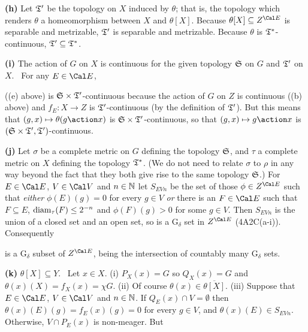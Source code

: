 {\medskip

{\bf (h)} Let $\frak T'$ be the topology on $X$ induced by $\theta$;
that is, the topology which renders $\theta$ a homeomorphism between $X$
and $\theta[X]$.   Because $\theta[X]\subseteq Z^{\Cal E}$ is separable
and metrizable, $\frak T'$ is separable and metrizable.   Because
$\theta$ is
$\frak T^*$-continuous, $\frak T'\subseteq\frak T^*$.

\medskip

{\bf (i)} The action of $G$ on $X$ is continuous for the given topology
$\frak S$ on $G$ and $\frak T'$ on $X$.   \Prf\ For any $E\in\Cal E$,


\noindent ((e) above) is $\frak S\times\frak T'$-continuous because the
action of $G$ on $Z$ is continuous ((b) above) and $f_E:X\to Z$ is
$\frak T'$-continuous (by the definition of $\frak T'$).   But this
means that $(g,x)\mapsto\theta(g\action x)$ is
$\frak S\times\frak T'$-continuous, so that $(g,x)\mapsto g\action x$ is
$(\frak S\times\frak T',\frak T')$-continuous.\ \Qed

\medskip

{\bf (j)} Let $\sigma$ be a complete metric on $G$ defining the topology
$\frak S$, and $\tau$ a complete metric on $X$ defining the topology
$\frak T^*$.   (We do not need to relate $\sigma$ to $\rho$ in any way
beyond the fact that they both give rise to the same topology $\frak
S$.)   For $E\in\Cal E$, $V\in\Cal V$ and $n\in\Bbb N$ let $S_{EVn}$ be
the set of those $\phi\in Z^{\Cal E}$ such that {\it either}
$\phi(E)(g)=0$ for every $g\in V$ {\it or} there is an $F\in\Cal E$ such
that $F\subseteq E$, $\mathop{\text{diam}}_{\tau}(F)\le 2^{-n}$ and $\phi(F)(g)>0$ for
some $g\in V$.   Then $S_{EVn}$ is the union of a closed set and an open
set, so is a G$_{\delta}$ set in $Z^{\Cal E}$ (4A2C(a-i)).
Consequently


\noindent is a G$_{\delta}$ subset of $Z^{\Cal E}$, being the
intersection of countably many G$_{\delta}$ sets.

\medskip

{\bf (k)} $\theta[X]\subseteq Y$.   \Prf\ Let $x\in X$.   (i) $P_X(x)=G$
so $Q_X(x)=G$ and $\theta(x)(X)=f_X(x)=\chi G$.   (ii) Of course
$\theta(x)\in\overline{\theta[X]}$.   (iii) Suppose that $E\in\Cal E$,
$V\in\Cal V$ and $n\in\Bbb N$.   If $Q_E(x)\cap V=\emptyset$ then
$\theta(x)(E)(g)=f_E(x)(g)=0$ for every $g\in V$, and
$\theta(x)(E)\in S_{EVn}$.   Otherwise, $V\cap P_E(x)$ is non-meager.
But

}
